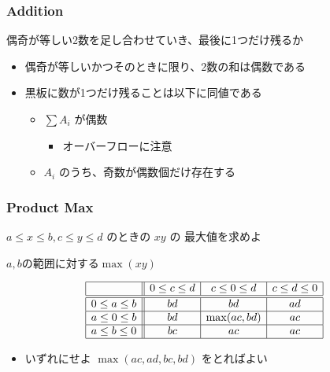 \documentclass[t, aspectratio=169, dvipdfmx]{beamer}
\begin{document}
\begin{frame}
  \frametitle{Addition}
  偶奇が等しい2数を足し合わせていき、最後に1つだけ残るか
  \begin{itemize}
    \item 偶奇が等しいかつそのときに限り、2数の和は偶数である
    \item 黒板に数が1つだけ残ることは以下に同値である
    \begin{itemize}
      \item $\sum A_i$ が偶数
      \begin{itemize}
        \item オーバーフローに注意
      \end{itemize}
      \item $A_i$ のうち、奇数が偶数個だけ存在する
    \end{itemize}
  \end{itemize}
\end{frame}

\begin{frame}
  \frametitle{Product Max}
  $a \leq x \leq b, c \leq y \leq d$ のときの $xy$ の 最大値を求めよ
  \begin{table}[t]
    \caption{$a,b$の範囲に対する$\max(xy)$}
    $$\begin{array}{|c||c|c|c|} \hline
      & 0 \leq c \leq d & c \leq 0 \leq d & c \leq d \leq 0 \\ \hline\hline
      0 \leq a \leq b & bd & bd & ad \\ \hline
      a \leq 0 \leq b & bd & \max(ac,bd) & ac \\ \hline
      a \leq b \leq 0 & bc & ac & ac \\ \hline
    \end{array}$$
  \end{table}
  \begin{itemize}
    \item いずれにせよ $\max(ac,ad,bc,bd)$ をとればよい
  \end{itemize}
\end{frame}
\end{document}

